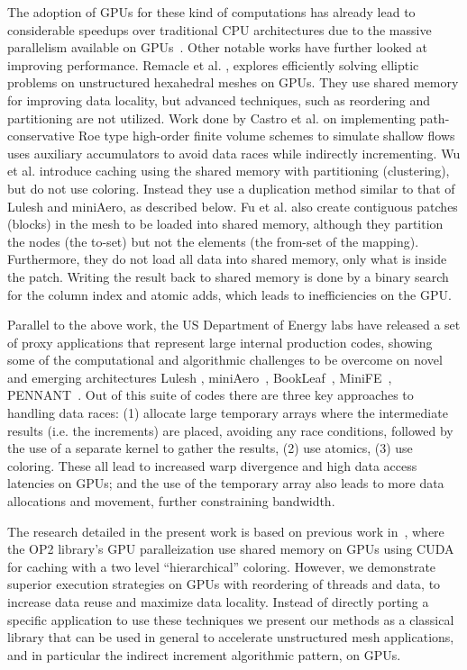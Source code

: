 The adoption of GPUs for these kind of computations has already lead to 
considerable speedups over traditional CPU architectures due to the 
massive parallelism available on GPUs~\cite{Reguly2015, ELSEN200810148, 
cohen2009fast}. Other notable works have further looked at improving 
performance. Remacle et al. \cite{remacle2016gpu}, explores efficiently solving 
elliptic problems on unstructured hexahedral meshes on GPUs. They use shared 
memory for improving data locality, but advanced techniques, such as reordering 
and partitioning are not utilized. Work done by Castro et al. 
\cite{shallow_water} on implementing path-conservative Roe type high-order 
finite volume schemes to simulate shallow flows uses auxiliary accumulators to 
avoid data races while indirectly incrementing. Wu et al. 
\cite{wu2013complexity} introduce caching using the shared memory with 
partitioning (clustering), but do not use coloring. Instead they use a 
duplication method similar to that of Lulesh and miniAero, as described below. 
Fu et al. \cite{fu2014architecting} also create contiguous patches (blocks) in 
the mesh to be loaded into shared memory, although they partition the nodes (the 
to-set) but not the elements (the from-set of the mapping). Furthermore, they do 
not load all data into shared memory, only what is inside the patch. Writing the 
result back to shared memory is done by a binary search for the column index and 
atomic adds, which leads to inefficiencies on the GPU. 

Parallel to the above work, the US Department of Energy labs have released a 
set of proxy applications that represent large internal production codes,
showing some of the computational and algorithmic challenges to be overcome on 
novel and emerging architectures Lulesh \cite{LULESH2:changes}, 
miniAero~\cite{miniaero}, BookLeaf~\cite{bookleaf}, MiniFE~\cite{minife}, 
PENNANT~\cite{pennant}. Out of this suite of codes there are three key 
approaches to handling data races: (1) allocate large temporary arrays where 
the intermediate results (i.e. the increments) are placed, avoiding any race 
conditions, followed by the use of a separate kernel to gather the results, 
(2) use atomics, (3) use coloring. These all lead to increased warp divergence 
and high data access latencies on GPUs; and the use of the temporary array also 
leads to more data allocations and movement, further constraining bandwidth. 

The research detailed in the present work is based on previous work 
in~\cite{op2}, where the OP2 library's GPU paralleization use shared memory on 
GPUs using CUDA for caching with a two level ``hierarchical'' coloring. However, 
we demonstrate superior execution strategies on GPUs with reordering of threads 
and data, to increase data reuse and maximize data locality. Instead of directly 
porting a specific application to use these techniques we present our methods 
as a classical library that can be used in general to accelerate unstructured 
mesh applications, and in particular the indirect increment algorithmic 
pattern, on GPUs.

